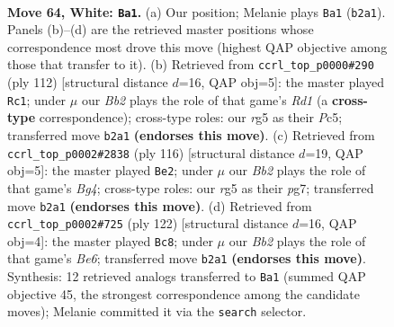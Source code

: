 \documentclass[11pt]{article}
\begin{document}
\clearpage

\begin{figure}[p]\centering
\begin{subfigure}{0.46\textwidth}\centering
\resizebox{\linewidth}{!}{%
\newchessgame
\chessboard[
  setfen={1k6/8/7R/pp4r1/b1p5/P1P5/1B1K4/8 w - - 34 64},
  showmover=false,
  pgfstyle=straightmove, color=movearrow, markmove={b2-a1}
]}
\caption{}
\end{subfigure}\hfill
\begin{subfigure}{0.46\textwidth}\centering
\resizebox{\linewidth}{!}{%
\newchessgame
\chessboard[
  setfen={8/8/r1b5/2P1k2p/6p1/4BpP1/5P1K/3R4 w - - 8 57},
  showmover=false,
  pgfstyle=straightmove, color=movearrow, markmove={d1-c1}
]}
\caption{}
\end{subfigure}
\\[4pt]
\begin{subfigure}{0.46\textwidth}\centering
\resizebox{\linewidth}{!}{%
\newchessgame
\chessboard[
  setfen={8/p5p1/Pbk4p/7P/4KPB1/8/8/8 w - - 23 59},
  showmover=false,
  pgfstyle=straightmove, color=movearrow, markmove={g4-e2}
]}
\caption{}
\end{subfigure}\hfill
\begin{subfigure}{0.46\textwidth}\centering
\resizebox{\linewidth}{!}{%
\newchessgame
\chessboard[
  setfen={8/8/4B3/1p4p1/3k1b1p/1P5P/6K1/8 w - - 2 62},
  showmover=false,
  pgfstyle=straightmove, color=movearrow, markmove={e6-c8}
]}
\caption{}
\end{subfigure}
\caption{\textbf{Move 64, White: \texttt{Ba1}.} (a) Our position; Melanie plays \texttt{Ba1} (\texttt{b2a1}). Panels (b)--(d) are the retrieved master positions whose correspondence most drove this move (highest QAP objective among those that transfer to it). (b) Retrieved from \texttt{ccrl\_top\_p0000\#290} (ply 112) [structural distance $d$=16, QAP obj=5]: the master played \texttt{Rc1}; under $\mu$ our \emph{Bb2} plays the role of that game's \emph{Rd1} (a \textbf{cross-type} correspondence); cross-type roles: our \emph{r}g5 as their \emph{P}c5; transferred move \texttt{b2a1} \textbf{(endorses this move)}. (c) Retrieved from \texttt{ccrl\_top\_p0002\#2838} (ply 116) [structural distance $d$=19, QAP obj=5]: the master played \texttt{Be2}; under $\mu$ our \emph{Bb2} plays the role of that game's \emph{Bg4}; cross-type roles: our \emph{r}g5 as their \emph{p}g7; transferred move \texttt{b2a1} \textbf{(endorses this move)}. (d) Retrieved from \texttt{ccrl\_top\_p0002\#725} (ply 122) [structural distance $d$=16, QAP obj=4]: the master played \texttt{Bc8}; under $\mu$ our \emph{Bb2} plays the role of that game's \emph{Be6}; transferred move \texttt{b2a1} \textbf{(endorses this move)}. Synthesis: 12 retrieved analogs transferred to \texttt{Ba1} (summed QAP objective 45, the strongest correspondence among the candidate moves); Melanie committed it via the \texttt{search} selector.}
\label{fig:thought-m126}
\end{figure}
\end{document}
